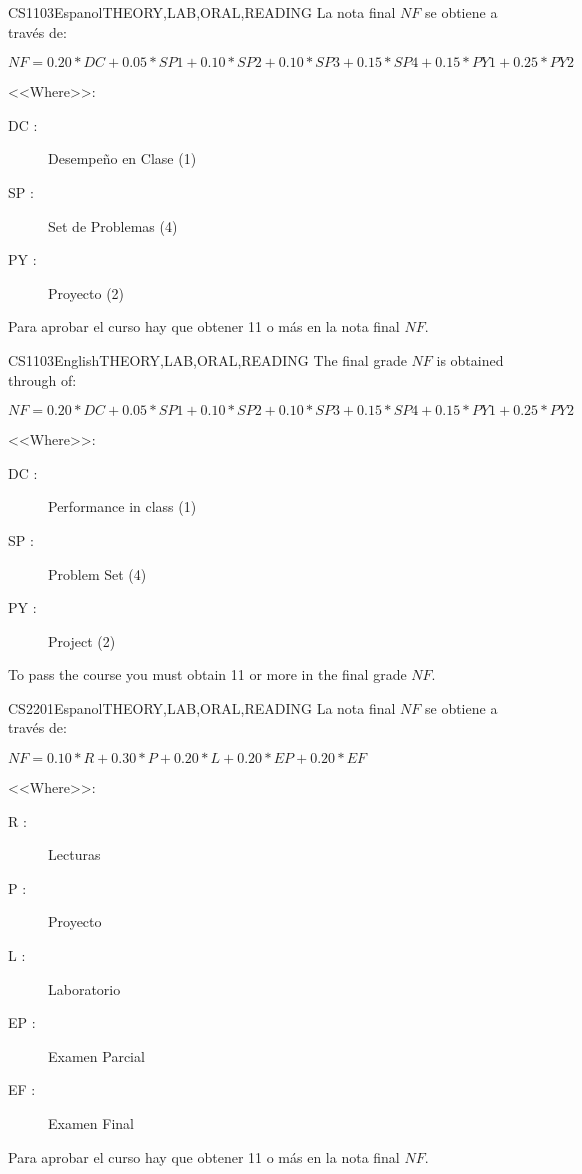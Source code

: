 \begin{evaluation}{CS1103}{Espanol}{THEORY,LAB,ORAL,READING}
La nota final $NF$ se obtiene a través de:

  $ NF = 0.20*DC + 0.05*SP1 + 0.10*SP2 + 0.10*SP3 + 0.15*SP4 +0.15*PY1
   + 0.25*PY2 $

<<Where>>:
  \begin{description}
		\item[DC :] Desempeño en Clase (1)
    \item[SP :] Set de Problemas (4)
    \item[PY :] Proyecto (2)
	\end{description}

	Para aprobar el curso hay que obtener 11 o más en la nota final $NF$.
\end{evaluation}

\begin{evaluation}{CS1103}{English}{THEORY,LAB,ORAL,READING}
The final grade $NF$ is obtained through of:

$ NF = 0.20*DC + 0.05*SP1 + 0.10*SP2 + 0.10*SP3 + 0.15*SP4 +0.15*PY1
 + 0.25*PY2 $

<<Where>>:
\begin{description}
  \item[DC :] Performance in class (1)
  \item[SP :] Problem Set (4)
  \item[PY :] Project (2)
\end{description}

	To pass the course you must obtain 11 or more in the final grade $NF$.
\end{evaluation}

\begin{evaluation}{CS2201}{Espanol}{THEORY,LAB,ORAL,READING}
La nota final $NF$ se obtiene a través de:

  $ NF =  0.10*R + 0.30*P + 0.20*L + 0.20*EP + 0.20*EF $

<<Where>>:
  \begin{description}
    \item[R :] Lecturas
		\item[P :] Proyecto
		\item[L :] Laboratorio
    \item[EP :] Examen Parcial
    \item[EF :] Examen Final
	\end{description}

	Para aprobar el curso hay que obtener 11 o más en la nota final $NF$.
\end{evaluation}

